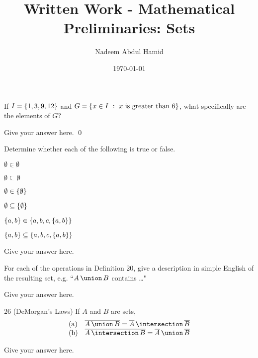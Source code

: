 \documentclass[10pt]{article}
\title{Written Work - Mathematical Preliminaries: Sets} 	%
\author{Nadeem Abdul Hamid}      			%
\date{\today}							%
\begin{document}
\maketitle

\begin{exersoln}{16}   %
	If $I = \left\lbrace 1, 3, 9, 12 \right\rbrace$ and $G = \left\lbrace x \in I\ :\ x~\textrm{is greater than 6} \right\rbrace$, what specifically 
	are the elements of $G$?
	
	\answer    %
	Give your answer here.
	\qed		%
\end{exersoln}

\begin{exersoln}{19}
	Determine whether each of the following is true or false.
\begin{exenumerate}
\item $\emptyset \in \emptyset$
\item $\emptyset \subseteq \emptyset$ 
\item $\emptyset \in \left\lbrace \emptyset \right\rbrace$
\item $\emptyset \subseteq \left\lbrace \emptyset \right\rbrace$
\item $\left\lbrace a, b \right\rbrace \in \left\lbrace a, b, c, \left\lbrace a, b \right\rbrace \right\rbrace$
\item $\left\lbrace a, b \right\rbrace \subseteq \left\lbrace a, b, c, \left\lbrace a, b \right\rbrace \right\rbrace$
\end{exenumerate}

	\answer
	Give your answer here.
\end{exersoln}

\begin{exersoln}{21}
	For each of the operations in Definition 20, give a description in simple English of the resulting set, e.g. ``$\setunion{A}{B}$ contains \ldots"

	\answer
	Give your answer here.
\end{exersoln}

\begin{thmsoln}{26 (DeMorgan's Laws)}
	If $A$ and $B$ are sets,
\[\begin{array}{ll} 
\textrm{(a)} &  \setcomplement{\setunion{A}{B}} = \setintersection{\setcomplement{A}}{\setcomplement{B}}
\\
\textrm{(b)} & \setcomplement{\setintersection{A}{B}} = \setunion{\setcomplement{A}}{\setcomplement{B}}
\end{array}\]

	\answer
	Give your answer here.
\end{thmsoln}
\end{document}
